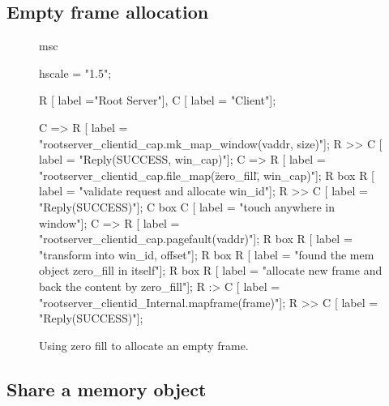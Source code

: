 %
%
%

\subsection{Empty frame allocation}

\begin{figure}[htb]
\begin{center}
\begin{msc}
msc {
    hscale = "1.5";

    R [ label ="Root Server"],
    C [ label = "Client"];
    
    C => R [ label = "rootserver\_clientid\_cap.mk\_map\_window(vaddr, size)"];
    R >> C [ label = "Reply(SUCCESS, win\_cap)"];
    C => R [ label = "rootserver\_clientid\_cap.file\_map(\"zero\_fill\", win\_cap)"];
    R box R [ label = "validate request and allocate win\_id"];
    R >> C [ label = "Reply(SUCCESS)"];
    C box C [ label = "touch anywhere in window"];
    C => R [ label = "rootserver\_clientid\_cap.pagefault(vaddr)"];
    R box R [ label = "transform into win\_id, offset"];
    R box R [ label = "found the mem object zero\_fill in itself"];
    R box R [ label = "allocate new frame and back the content by zero\_fill"];
    R :> C [ label = "rootserver\_clientid\_Internal.mapframe(frame)"];
    R >> C [ label = "Reply(SUCCESS)"];
}
\end{msc}
\end{center}
\caption{Using zero fill to allocate an empty frame.}
\end{figure}

\subsection{Share a memory object}


